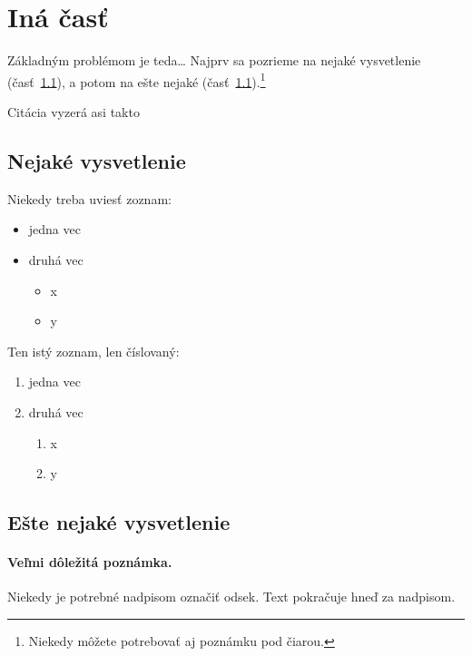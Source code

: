 \documentclass[10pt,twoside,slovak,a4paper]{article}
\begin{document}
\section{Iná časť}\label{ina}

Základným problémom je teda\ldots{} Najprv sa pozrieme na nejaké vysvetlenie (časť~\ref{ina:nejake}), a potom na ešte nejaké (časť~\ref{ina:nejake}).\footnote{Niekedy môžete potrebovať aj poznámku pod čiarou.}

Citácia vyzerá asi takto~\cite{Bicalho2020}
\subsection{Nejaké vysvetlenie}\label{ina:nejake}

Niekedy treba uviesť zoznam:

\begin{itemize}
\item jedna vec
\item druhá vec
	\begin{itemize}
	\item x
	\item y
	\end{itemize}
\end{itemize}

Ten istý zoznam, len číslovaný:

\begin{enumerate}
\item jedna vec
\item druhá vec
	\begin{enumerate}
	\item x
	\item y
	\end{enumerate}
\end{enumerate}

\subsection{Ešte nejaké vysvetlenie}\label{ina:este}

\paragraph{Veľmi dôležitá poznámka.}
Niekedy je potrebné nadpisom označiť odsek. Text pokračuje hneď za nadpisom.
\end{document}
